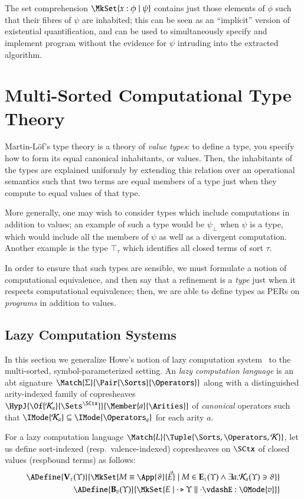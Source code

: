 \documentclass[11pt]{article}
\theoremstyle{definition}
\theoremstyle{notation}
\theoremstyle{remark}
\numberwithin{equation}{section}
\newcommand\IsSubsetEq[2]{\IMode{#1}\subseteq\IMode{#2}}
\newcommand\CanOperators{\mathcal{K}}
\newcommand\IsAbtUnmoded[5]{
  #1\triangleright%
  #2\parallel%
  #3\vdash%
  #4:\OMode{#5}%
}
\newcommand\TyTop[1]{\top_{#1}}
\newcommand\Exprs{\mathbf{E}}
\newcommand\Values{\mathbf{V}}
\newcommand\BTms{\mathbf{B}}
\begin{document}
The set comprehension $\MkSet{x:\phi\mid\psi}$ contains just those elements of
$\phi$ such that their fibres of $\psi$ are inhabited; this can be seen as an
``implicit'' version of existential quantification, and can be used to
simultaneously specify and implement program without the evidence for $\psi$
intruding into the extracted algorithm.

\section{Multi-Sorted Computational Type Theory}
\label{sec:ctt}

Martin-L\"of's type theory is a theory of \emph{value types}: to define a type,
you specify how to form its equal canonical inhabitants, or values. Then, the
inhabitants of the types are explained uniformly by extending this relation
over an operational semantics such that two terms are equal members of a
type just when they compute to equal values of that type.

More generally, one may wish to consider types which include computations in
addition to values; an example of such a type would be $\psi_\bot$ when $\psi$
is a type, which would include all the members of $\psi$ as well as a divergent
computation. Another example is the type $\TyTop{\tau}$ which identifies all
closed terms of sort $\tau$.

In order to ensure that such types are sensible, we must formulate a notion of
computational equivalence, and then say that a refinement is a \emph{type} just
when it respects computational equivalence; then, we are able to define types
as PERs on \emph{programs} in addition to values.


\subsection{Lazy Computation Systems}

In this section we generalize Howe's notion of lazy computation
system~\cite{howe:1989} to the multi-sorted, symbol-parameterized setting. An
\emph{lazy computation language} is an abt signature
$\Match{\Sigma}{\Pair{\Sorts}{\Operators}}$ along with a distinguished
arity-indexed family of copresheaves
$\HypJ{\Of{\CanOperators_a}{\Sets^\SCtx}}{\Member{a}{\Arities}}$ of
\emph{canonical} operators such that
$\IsSubsetEq{\CanOperators_a}{\Operators_a}$ for each arity $a$.

For a lazy computation language
$\Match{L}{\Tuple{\Sorts,\Operators,\CanOperators}}$, let us define
sort-indexed (resp.\ valence-indexed) copresheaves on $\SCtx$ of closed values
(resp\. bound terms) as follows:
\begin{align*}
  \ADefine{\Values_\tau(\Upsilon)}{
    \MkSet{
      M\equiv\App{\vartheta}{\vec{E}}
      \mid M\in\Exprs_\tau(\Upsilon)\land \exists a. \CanOperators_a(\Upsilon)\ni\vartheta
    }
  }\\
  \ADefine{
    \BTms_{v}(\Upsilon)
  }{
    \MkSet{E \mid \IsAbtUnmoded{\cdot}{\Upsilon}{\cdot}{E}{v}}
  }
\end{align*}
\end{document}
